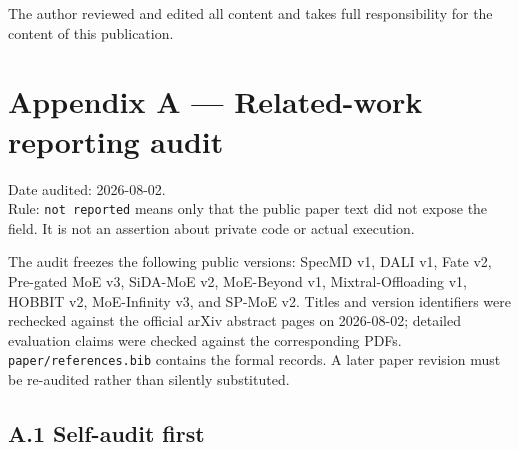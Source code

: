 \documentclass[
  10pt,
  letterpaper,
  10pt]{article}
\begin{document}
The author reviewed and edited all content and takes full responsibility
for the content of this publication.

\section{Appendix A --- Related-work reporting
audit}\label{appendix-a-related-work-reporting-audit}

Date audited: 2026-08-02.\\
Rule: \texttt{not\ reported} means only that the public paper text did
not expose the field. It is not an assertion about private code or
actual execution.

The audit freezes the following public versions: SpecMD v1, DALI v1,
Fate v2, Pre-gated MoE v3, SiDA-MoE v2, MoE-Beyond v1,
Mixtral-Offloading v1, HOBBIT v2, MoE-Infinity v3, and SP-MoE v2. Titles
and version identifiers were rechecked against the official arXiv
abstract pages on 2026-08-02; detailed evaluation claims were checked
against the corresponding PDFs. \texttt{paper/references.bib} contains
the formal records. A later paper revision must be re-audited rather
than silently substituted.

\subsection{A.1 Self-audit first}\label{a.1-self-audit-first}
\end{document}
